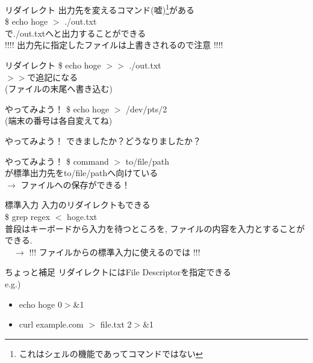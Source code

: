 \documentclass[uplatex, dvipdfmx, unicode]{beamer}
\begin{document}
\begin{frame}{リダイレクト}
  出力先を変えるコマンド(嘘)\footnote{これはシェルの機能であってコマンドではない}がある \\
  \$ echo hoge \alert{$>$ ./out.txt} \\
  で./out.txtへと出力することができる \\
  \vspace{.2in}
  \alert{!!!! 出力先に指定したファイルは上書きされるので注意 !!!!}
\end{frame}

\begin{frame}{リダイレクト}
  \$ echo hoge \alert{$>>$ ./out.txt} \\
  $>>$で追記になる \\
  (ファイルの末尾へ書き込む)
\end{frame}

\begin{frame}{やってみよう！}
  \$ echo hoge $>$ /dev/pts/2 \\
  (端末の番号は各自変えてね)
\end{frame}

\begin{frame}{やってみよう！}
  できましたか？どうなりましたか？\faHandPaperO
\end{frame}

\begin{frame}{やってみよう！}
  \$ command \alert{$>$ to/file/path} \\
  が標準出力先をto/file/pathへ向けている \\
  $\rightarrow$ ファイルへの保存ができる！ \\
  \vspace{.5cm}
\end{frame}

\begin{frame}{標準入力}
  入力のリダイレクトもできる \\
  \$ grep regex $<$ hoge.txt \\
  \vspace{.2in}
  普段はキーボードから入力を待つところを, ファイルの内容を入力とすることができる. \\
  \ \ $\rightarrow$ !!! ファイルからの標準入力に使えるのでは !!! \\
\end{frame}

\begin{frame}{ちょっと補足}
  リダイレクトにはFile Descriptorを指定できる \\
  e.g.)
  \begin{itemize}
    \item{echo hoge 0$>$\&1}
    \item{curl example.com $>$ file.txt 2$>$\&1 }
  \end{itemize}
\end{frame}
\end{document}
